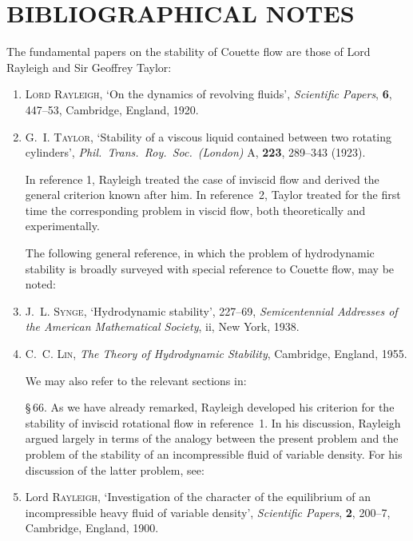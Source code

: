 \section*{BIBLIOGRAPHICAL NOTES}

The fundamental papers on the stability of Couette flow are those of Lord
Rayleigh and Sir Geoffrey Taylor:

\begin{enumerate}
\item \textsc{Lord Rayleigh}, `On the dynamics of revolving fluids', \textit{Scientific Papers},
\textbf{6}, 447--53, Cambridge, England, 1920.

\item G.~I. \textsc{Taylor}, `Stability of a viscous liquid contained between two rotating
cylinders', \textit{Phil.\ Trans.\ Roy.\ Soc.\ (London)} A, \textbf{223}, 289--343 (1923).

\noindent In reference 1, Rayleigh treated the case of inviscid flow and derived the general
criterion known after him.  In reference~2, Taylor treated for the first time the
corresponding problem in viscid flow, both theoretically and experimentally.

\noindent The following general reference, in which the problem of hydrodynamic stability
is broadly surveyed with special reference to Couette flow, may be noted:

\item J.~L. \textsc{Synge}, `Hydrodynamic stability', 227--69, \textit{Semicentennial Addresses
of the American Mathematical Society}, ii, New York, 1938.

\item C.~C. \textsc{Lin}, \textit{The Theory of Hydrodynamic Stability}, Cambridge, England, 1955.

\noindent We may also refer to the relevant sections in:

\medskip
\noindent\S\,66.  As we have already remarked, Rayleigh developed his criterion for the
stability of inviscid rotational flow in reference~1.  In his discussion, Rayleigh
argued largely in terms of the analogy between the present problem and the
problem of the stability of an incompressible fluid of variable density.  For his
discussion of the latter problem, see:

\item Lord \textsc{Rayleigh}, `Investigation of the character of the equilibrium of an
incompressible heavy fluid of variable density', \textit{Scientific Papers}, \textbf{2},
200--7, Cambridge, England, 1900.


\end{enumerate}
